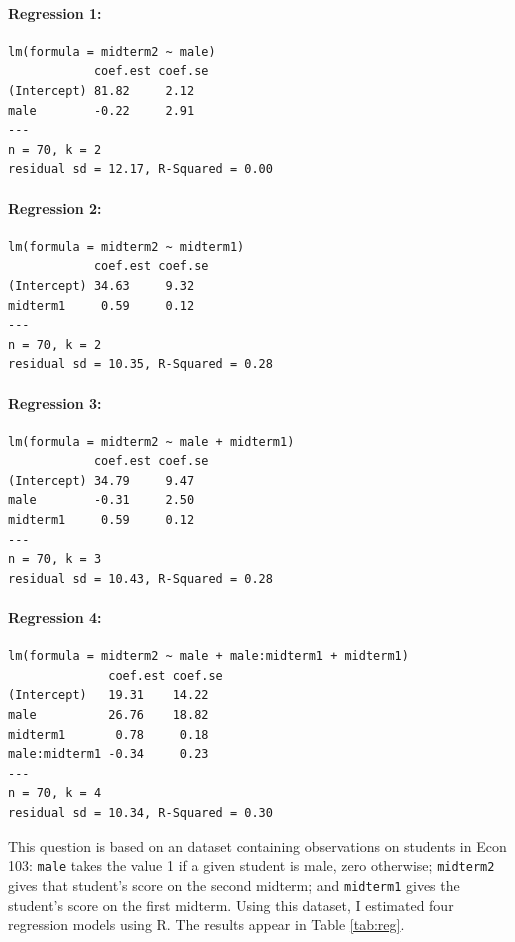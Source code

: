 \documentclass[addpoints,12pt]{exam}
\begin{document}
\begin{questions}
\begin{table}
\footnotesize
\caption{Regression Results}
\paragraph{Regression 1:}
\begin{verbatim}
lm(formula = midterm2 ~ male)
            coef.est coef.se
(Intercept) 81.82     2.12  
male        -0.22     2.91  
---
n = 70, k = 2
residual sd = 12.17, R-Squared = 0.00
	\end{verbatim}
	\paragraph{Regression 2:}
	\begin{verbatim}
lm(formula = midterm2 ~ midterm1)
            coef.est coef.se
(Intercept) 34.63     9.32  
midterm1     0.59     0.12  
---
n = 70, k = 2
residual sd = 10.35, R-Squared = 0.28
	\end{verbatim}
	\paragraph{Regression 3:}
	\begin{verbatim}
lm(formula = midterm2 ~ male + midterm1)
            coef.est coef.se
(Intercept) 34.79     9.47  
male        -0.31     2.50  
midterm1     0.59     0.12  
---
n = 70, k = 3
residual sd = 10.43, R-Squared = 0.28
	\end{verbatim}
	\paragraph{Regression 4:}
	\begin{verbatim}
lm(formula = midterm2 ~ male + male:midterm1 + midterm1)
              coef.est coef.se
(Intercept)   19.31    14.22  
male          26.76    18.82  
midterm1       0.78     0.18  
male:midterm1 -0.34     0.23  
---
n = 70, k = 4
residual sd = 10.34, R-Squared = 0.30
	\end{verbatim}
	\label{tab:reg}
\end{table}


\question This question is based on an dataset containing observations on students in Econ 103: \texttt{male} takes the value 1 if a given student is male, zero otherwise; \texttt{midterm2} gives that student's score on the second midterm; and \texttt{midterm1} gives the student's score on the first midterm. Using this dataset, I estimated four regression models using R. The results appear in Table \ref{tab:reg}. 


\end{questions}
\end{document}
